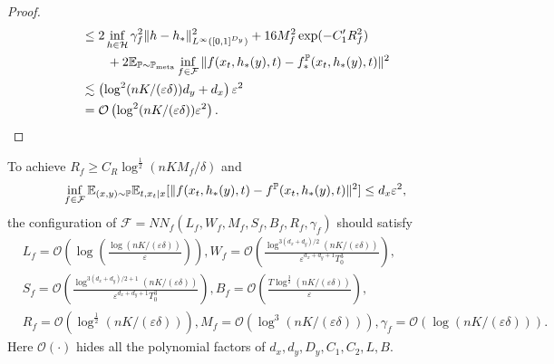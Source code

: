 \documentclass[11pt]{article}
\numberwithin{equation}{section}
\newcommand{\Pmeta}{\mathbb{P}_{\text{meta}}}
\renewcommand{\P}{\mathbb{P}}
\begin{document}
\begin{proof}
\begin{equation}
\begin{aligned}
            &\leq 2\inf_{h\in\mathcal{H}}\gamma_f^2\|h-h_*\|_{L^\infty([0,1]^{D_y})}^2 + 16M_f^2\exp(-C_1'R_f^2) \\
            &\qquad +2\E_{\P\sim\Pmeta}\inf_{f\in\mathcal{F}}\|f(x_t,h_*(y),t)-f_*^\P(x_t,h_*(y),t)\|^2 \\
            &\lesssim \left(\log^2(nK/(\varepsilon\delta))d_y+ d_x\right)\varepsilon^2 \\
            &= \mathcal{O}\left(\log^2(nK/(\varepsilon\delta))\varepsilon^2\right).
        \end{aligned}
    \end{equation}
\end{proof}

\begin{prop}\label{prop:approximation_f}
    To achieve $R_f\geq C_R\log^{\frac{1}{2}}(nKM_f/\delta)$ and
    \begin{equation}
        \inf_{f\in\mathcal{F}}\E_{(x,y)\sim\P}\E_{t,x_t|x} [\|f(x_t,h_*(y),t)-f^\P(x_t,h_*(y),t)\|^2] \leq d_x\varepsilon^2,
    \end{equation}
    the configuration of $\mathcal{F}=NN_f(L_f,W_f,M_f,S_f,B_f,R_f,\gamma_f)$ should satisfy
    \begin{equation}
        \begin{aligned}
            &L_f=\mathcal{O}\left(\log\left(\frac{\log(nK/(\varepsilon\delta))}{\varepsilon}\right)\right),
            W_f=\mathcal{O}\left(\frac{\log^{3(d_x+d_y)/2}(nK/(\varepsilon\delta))}{\varepsilon^{d_x+d_y+1}T_0^3}\right), \\
            &S_f=\mathcal{O}\left(\frac{\log^{3(d_x+d_y)/2+1}(nK/(\varepsilon\delta))}{\varepsilon^{d_x+d_y+1}T_0^3}\right),
            B_f=\mathcal{O}\left(\frac{T\log^{\frac{3}{2}}(nK/(\varepsilon\delta))}{\varepsilon}\right), \\
            &R_f=\mathcal{O}\left(\log^{\frac{1}{2}}(nK/(\varepsilon\delta))\right), 
            M_f=\mathcal{O}\left(\log^3(nK/(\varepsilon\delta))\right),
            \gamma_f=\mathcal{O}\left(\log(nK/(\varepsilon\delta))\right).
        \end{aligned}
    \end{equation}
    Here $\mathcal{O}(\cdot)$ hides all the polynomial factors of $d_x,d_y,D_y,C_1,C_2,L,B$.
\end{prop}
\end{document}
